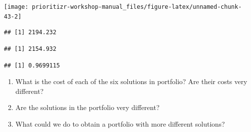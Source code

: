 \documentclass[12pt,]{book}
\newenvironment{Shaded}{\begin{snugshade}}{\end{snugshade}}
\newcommand{\KeywordTok}[1]{\textcolor[rgb]{0.13,0.29,0.53}{\textbf{#1}}}
\newcommand{\DecValTok}[1]{\textcolor[rgb]{0.00,0.00,0.81}{#1}}
\newcommand{\StringTok}[1]{\textcolor[rgb]{0.31,0.60,0.02}{#1}}
\newcommand{\CommentTok}[1]{\textcolor[rgb]{0.56,0.35,0.01}{\textit{#1}}}
\newcommand{\OperatorTok}[1]{\textcolor[rgb]{0.81,0.36,0.00}{\textbf{#1}}}
\newcommand{\NormalTok}[1]{#1}
\providecommand{\tightlist}{%
  \setlength{\itemsep}{0pt}\setlength{\parskip}{0pt}}
\let\BeginKnitrBlock\begin \let\EndKnitrBlock\end
\begin{document}
\begin{center}\texttt{[image: prioritizr-workshop-manual\_files/figure-latex/unnamed-chunk-43-2]} \end{center}

\begin{Shaded}
\end{Shaded}

\begin{verbatim}
## [1] 2194.232
\end{verbatim}

\begin{Shaded}
\end{Shaded}

\begin{verbatim}
## [1] 2154.932
\end{verbatim}

\begin{Shaded}
\end{Shaded}

\begin{verbatim}
## [1] 0.9699115
\end{verbatim}

\BeginKnitrBlock{rmdquestion}
\begin{enumerate}
\def\labelenumi{\arabic{enumi}.}
\tightlist
\item
  What is the cost of each of the six solutions in portfolio? Are their
  costs very different?
\item
  Are the solutions in the portfolio very different?
\item
  What could we do to obtain a portfolio with more different solutions?
\end{enumerate}
\EndKnitrBlock{rmdquestion}
\end{document}
